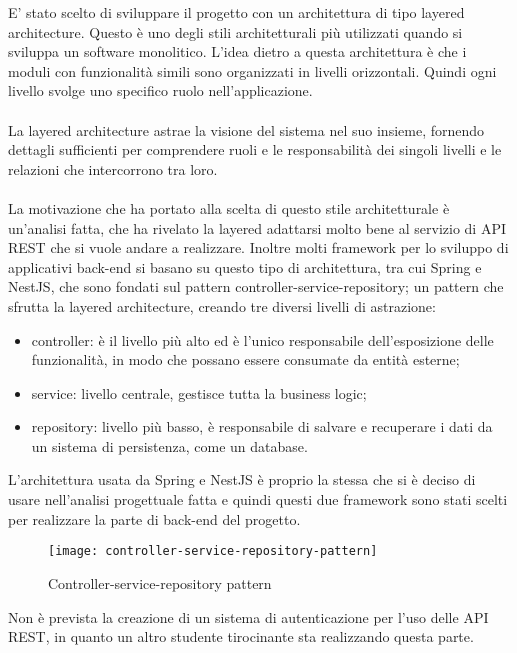 E' stato scelto di sviluppare il progetto con un architettura di tipo layered architecture. Questo è uno
degli stili architetturali più utilizzati quando si sviluppa un software monolitico. L'idea dietro a 
questa architettura è che i moduli con funzionalità simili sono organizzati in livelli
orizzontali. Quindi ogni livello svolge uno specifico ruolo nell'applicazione.
\\\\
La layered architecture astrae la visione del sistema nel suo insieme, fornendo dettagli 
sufficienti per comprendere ruoli e le responsabilità dei singoli livelli e le relazioni
che intercorrono tra loro.
\\\\
La motivazione che ha portato alla scelta di questo stile architetturale è un'analisi fatta,
che ha rivelato la layered adattarsi molto bene al servizio di \gls{API} \gls{REST} che
si vuole andare a realizzare. Inoltre molti framework per lo sviluppo di applicativi \gls{back-end} si basano su questo tipo di architettura, tra cui
Spring e NestJS, che sono fondati sul pattern controller-service-repository; un pattern
che sfrutta la layered architecture, creando tre diversi livelli di astrazione: 
\begin{itemize}
    \item controller: è il livello più alto ed è l'unico responsabile dell'esposizione delle
        funzionalità, in modo che possano essere consumate da entità esterne;
    \item service: livello centrale, gestisce tutta la business logic;
    \item repository: livello più basso, è responsabile di salvare e recuperare i dati da un
        sistema di persistenza, come un database.
\end{itemize}
\clearpage
\leavevmode\newline
L'architettura usata da Spring e NestJS è proprio la stessa che si è deciso di usare nell'analisi progettuale fatta 
 e quindi questi due framework sono stati scelti per realizzare
la parte di \gls{back-end} del progetto.
\leavevmode\newline
\begin{figure}[H]
    \centering
    \texttt{[image: controller-service-repository-pattern]}
    \caption{Controller-service-repository pattern}
\end{figure}
\leavevmode\newline
Non è prevista la creazione di un sistema di autenticazione per l'uso delle \gls{API} \gls{REST}, in quanto 
un altro studente tirocinante sta realizzando questa parte.

